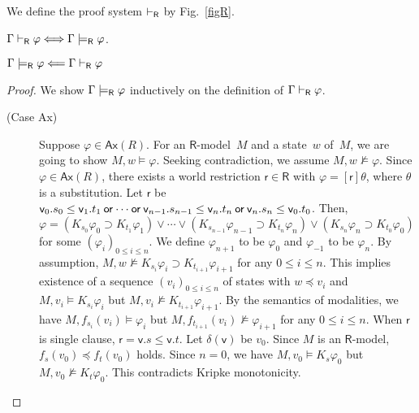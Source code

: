     \begin{definition}
     We define the proof system $\vdash_{\mathsf R}$ by Fig.~\ref{figR}.
    \end{definition}

    \begin{theorem}
     \label{sound-comp-nat-kripke}
     $\Gamma\vdash_{\mathsf R}\varphi\Longleftrightarrow\Gamma\models_{\mathsf R} \varphi$\enspace.
    \end{theorem}
    \begin{lemma}[Soundness]
     $\Gamma\models_{\mathsf R}\varphi\Longleftarrow\Gamma\vdash_{\mathsf R}\varphi$
    \end{lemma}
    \begin{proof}
     We show $\Gamma\models_{\mathsf R}\varphi$ inductively
     on the definition of $\Gamma\vdash_{\mathsf R}\varphi$.
     \begin{description}
      \item[(Case {Ax})]
	   Suppose $\varphi\in \mathsf{Ax}(R)$.
	   For an $\mathsf{R}$-model~$M$ and a state~$w$ of~$M$,
	   we are going to show $M,w\models\varphi$.
	   Seeking contradiction,
	   we assume $M,w\not\models\varphi$.
	   Since $\varphi\in\mathsf{Ax}(R)$, there exists a world
	   restriction $\mathsf r\in\mathsf R$ with
	   $\varphi=[\mathsf r]\theta$,
	   where $\theta$ is a substitution.
	   Let $\mathsf r$ be
	   $\mathsf v_0.s_0\le\mathsf v_1.t_1\mathbin{\mathsf{or}}\cdots\mathbin{\mathsf{or}}
	   \mathsf v_{n-1}.s_{n-1}\le\mathsf v_n.t_n\mathbin{\mathsf{or}}\mathsf
	   v_n.s_n\le\mathsf v_0.t_0$.
	   Then,
	   $\varphi = (K_{s_0}\varphi_0\supset
	   K_{t_1}\varphi_1)\vee\cdots\vee
	   (K_{s_{n-1}}\varphi_{n-1}\supset K_{t_n}\varphi_n)
	   \vee (K_{s_n}\varphi_n\supset K_{t_0}\varphi_0)$
	   for some $(\varphi_i)_{0\le i\le n}$.
	   We define $\varphi_{n+1}$ to be $\varphi_0$ and
	   $\varphi_{-1}$ to be $\varphi_n$.
	   By assumption, $M,w\not\models K_{s_i}\varphi_i\supset
	   K_{t_{i+1}}\varphi_{i+1}$ for any $0\le i\le n$.
	   This implies existence of a sequence
	   $(v_i)_{0\le i\le n}$ of states with $w\preceq v_i$ and
	   $M,v_i\models K_{s_i}\varphi_i$ but $M,v_i\not\models
	   K_{t_{i+1}}\varphi_{i+1}$.
	   By the semantics of modalities, we have
	   $M,f_{s_i}(v_i)\models \varphi_i$ but $M,
	   f_{t_{i+1}}(v_i)\not\models\varphi_{i+1}$
	   for any $0\le i\le n$.
	   When $\mathsf r$ is single clause,
	   $\mathsf r = \mathsf v.s\le\mathsf v.t$.
	   Let $\delta(\mathsf v)$ be $v_0$.
	   Since $M$ is an $\mathsf R$-model,
	   $f_s(v_0)\preceq f_t(v_0)$ holds.
	   Since $n=0$,
	   we have $M,v_0\models K_s\varphi_0$ but $M,v_0\not\models
	   K_t\varphi_0$.
	   This contradicts Kripke monotonicity.

\end{description}
\end{proof}
